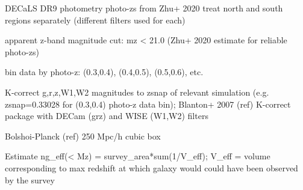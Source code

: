 
DECaLS DR9 photometry
photo-zs from Zhu+ 2020
treat north and south regions separately (different filters used for each)

apparent z-band magnitude cut: mz < 21.0 (Zhu+ 2020 estimate for reliable photo-zs)

bin data by photo-z: (0.3,0.4), (0.4,0.5), (0.5,0.6), etc.

K-correct g,r,z,W1,W2 magnitudes to zsnap of relevant simulation (e.g. zsnap=0.33028 for (0.3,0.4) photo-z data bin); Blanton+ 2007 (ref) K-correct package with DECam (grz) and WISE (W1,W2) filters





Bolshoi-Planck (ref)
250 Mpc/h cubic box


Estimate ng_eff(< Mz) = survey_area*sum(1/V_eff); V_eff = volume corresponding to max redshift at which galaxy would could have been observed by the survey

